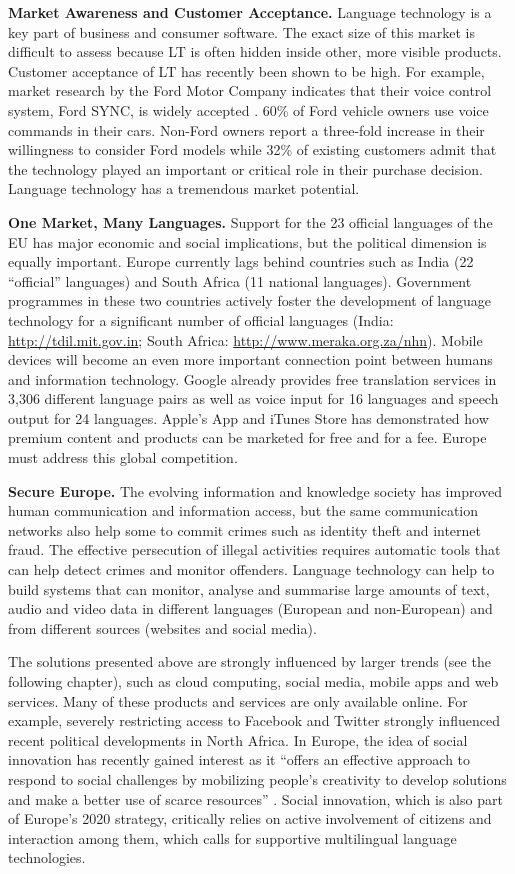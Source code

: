 \documentclass[10pt, plain]{../../metanetpaper}
\begin{document}
\begin{multicols}{2}
\textbf{Market Awareness and Customer Acceptance.} Language technology is a key part of business and consumer software. The exact size of this market is difficult to assess because LT is often hidden inside other, more visible products. Customer acceptance of LT has recently been shown to be high. For example, market research by the Ford Motor Company indicates that their voice control system, Ford SYNC, is widely accepted \cite{ford}. 60\% of Ford vehicle owners use voice commands in their cars. Non-Ford owners report a three-fold increase in their willingness to consider Ford models while 32\% of existing customers admit that the technology played an important or critical role in their purchase decision. Language technology has a tremendous market potential.

\textbf{One Market, Many Languages.} Support for the 23 official languages of the EU has major economic and social implications, but the political dimension is equally important. Europe currently lags behind countries such as India (22 “official” languages) and South Africa (11 national languages). Government programmes in these two countries actively foster the development of language technology for a significant number of official languages (India: \url{http://tdil.mit.gov.in}; South Africa: \url{http://www.meraka.org.za/nhn}). Mobile devices will become an even more important connection point between humans and information technology. Google already provides free translation services in 3,306 different language pairs as well as voice input for 16 languages and speech output for 24 languages. Apple's App and iTunes Store has demonstrated how premium content and products can be marketed for free and for a fee. Europe must address this global competition.

\textbf{Secure Europe.} The evolving information and knowledge society has improved human communication and information access, but the same communication networks also help some to commit crimes such as identity theft and internet fraud. The effective persecution of illegal activities requires automatic tools that can help detect crimes and monitor offenders. Language technology can help to build systems that can monitor, analyse and summarise large amounts of text, audio and video data in different languages (European and non-European) and from different sources (websites and social media).

The solutions presented above are strongly influenced by larger trends (see the following chapter), such as cloud computing, social media, mobile apps and web services. Many of these products and services are only available online. For example, severely restricting access to Facebook and Twitter strongly influenced recent political developments in North Africa. In Europe, the idea of social innovation has recently gained interest as it “offers an effective approach to respond to social challenges by mobilizing people's creativity to develop solutions and make a better use of scarce resources” \cite{EC5}. Social innovation, which is also part of Europe’s 2020 strategy, critically relies on active involvement of citizens and interaction among them, which calls for supportive multilingual language technologies.


\end{multicols}
\end{document}
